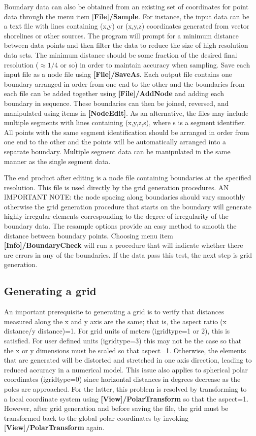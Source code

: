 \documentclass{article}
\begin{document}
Boundary data can also be obtained from an existing set of coordinates for point data through the menu item
\textbf{[File]/Sample}. For instance, the input data can be a text file with lines containing (x,y) or (x,y,z) coordinates
generated from vector shorelines or other sources. The program will prompt for a minimum distance between data
points and then filter the data to reduce the size of high resolution data sets. The minimum distance should be some
fraction of the desired final resolution ($\approx 1/4$ or so) in order to maintain accuracy when sampling. 
Save each input file as a node file using \textbf{[File]/SaveAs}. Each output file
contains one boundary arranged in order from one end to the other and the boundaries from each file can be 
added together using \textbf{[File]/AddNode} and adding each boundary in sequence.
These boundaries can then be joined, reversed, and manipulated using items in \textbf{[NodeEdit]}.
As an alternative, the files may include multiple segments with lines containing (x,y,z,s), where s is a segment
identifier. All points with the same segment identification should be arranged in order from one end to the other
and the points will be automatically arranged into a separate boundary. Multiple segment data can be manipulated
 in the same manner as the single segment data.
 
 The end product after editing is a node file containing boundaries at the specified resolution. This file is used directly
 by the grid generation procedures. AN IMPORTANT NOTE: the node spacing along boundaries should vary smoothly
 otherwise the grid generation procedure that starts on the boundary will generate highly irregular elements 
corresponding to the degree of irregularity of the boundary data. The resample options provide an easy method to
smooth the distance between boundary points. Choosing menu item  \textbf{[Info]/BoundaryCheck} will run a 
procedure that will indicate whether there are errors in any of the boundaries. If the data pass this test, the next
step is grid generation.

\subsection{Generating a grid}

An important prerequisite to generating a grid is to verify that distances measured along the x and y axis are the same;
that is, the aspect ratio (x distance/y distance)=1. For grid units of meters (igridtype=1 or 2), this is satisfied. For user
defined units (igridtype=3) this may not be the case so that the x or y dimensions must be scaled so that aspect=1.
Otherwise, the elements that are generated will be distorted and stretched in one axis direction, leading to reduced
accuracy in a numerical model. This issue also applies to spherical polar coordinates (igridtype=0) since horizontal 
distances in degrees decrease as the poles are approached. For the latter, this problem is resolved by transforming
to a local coordinate system using \textbf{[View]/PolarTransform} so that the aspect=1. However, after grid generation
and before saving the file, the grid must be transformed back to the global polar coordinates by invoking
\textbf{[View]/PolarTransform} again. 
\end{document}
